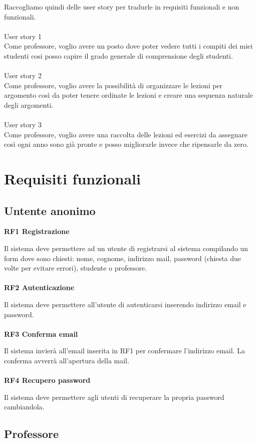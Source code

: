 Raccogliamo quindi delle user story per tradurle in requisiti funzionali e non funzionali.\\
\\
\Large{User story 1}\\
Come professore, voglio avere un posto dove poter vedere tutti i compiti dei miei studenti cosi posso capire il grado generale di comprensione degli studenti.\\
\\
\Large{User story 2}\\
Come professore, voglio avere la possibilità di organizzare le lezioni per argomento così da poter tenere ordinate le lezioni e creare una sequenza naturale degli argomenti.\\
\\
\Large{User story 3}\\
Come professore, voglio avere una raccolta delle lezioni ed esercizi da assegnare così ogni anno sono già pronte e posso migliorarle invece che ripensarle da zero.
\section{Requisiti funzionali}
\subsection{Untente anonimo}

\textbf{RF1 Registrazione}

Il sistema deve permettere ad un utente di registrarsi al sistema compilando un form dove sono chiesti: nome, cognome, indirizzo mail, password (chiesta due volte per evitare errori), studente o professore.\\
\\
\textbf{RF2 Autenticazione}

Il sistema deve permettere all'utente di autenticarsi inserendo indirizzo email e password.\\
\\
\textbf{RF3 Conferma email}

Il sistema invierà all'email inserita in RF1 per confermare l'indirizzo email. La conferma avverrà all'apertura della mail.\\
\\
\textbf{RF4 Recupero password}

Il sistema deve permettere agli utenti di recuperare la propria password  cambiandola.
\subsection{Professore}

